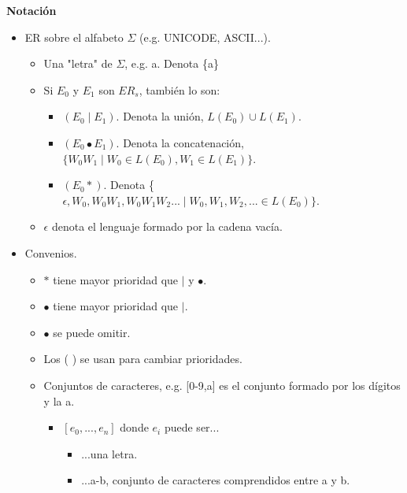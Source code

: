 \documentclass[\main/Apuntes_PL.tex]{subfiles}
\begin{document}
      \newpage
      \par \noindent
      \textbf{\large Notación}
      \begin{itemize}
        \item ER sobre el alfabeto $\Sigma$ (e.g. UNICODE, ASCII...).
              \begin{itemize}
                \item Una "letra" de $\Sigma$, e.g. a. Denota \{a\}
                \item Si $E_0$ y $E_1$ son $ER_s$, también lo son:
                      \begin{itemize}
                        \item $(E_0 \mid E_1)$. Denota la unión, $L(E_0) \cup L(E_1).$
                        \item $(E_0 \bullet E_1)$. Denota la concatenación, $ \{W_0 W_1 \mid W_0 \in  L(E_0), W_1 \in L(E_1)\}$.
                        \item $(E_0 \ast)$. Denota \{$\epsilon, W_0, W_0 W_1, W_0 W_1 W_2 ...\mid W_0, W_1, W_2, ... \in L(E_0)\}$.
                      \end{itemize}
                \item $\epsilon$ denota el lenguaje formado por la cadena vacía.
              \end{itemize}
        \item Convenios.
              \begin{itemize}
                \item $\ast$ tiene mayor prioridad que $\mid$ y $\bullet$.
                \item $\bullet$ tiene mayor prioridad que $\mid$.
                \item $\bullet$ se puede omitir.
                \item Los ( ) se usan para cambiar prioridades.
                \item Conjuntos de caracteres, e.g. [0-9,a] es el conjunto formado por los dígitos y la a.
                      \begin{itemize}
                        \item $[e_0, ..., e_n]$ donde $e_i$ puede ser...
                              \begin{itemize}
                                \item ...una letra.
                                \item ...a-b, conjunto de caracteres comprendidos entre a y b.
                              \end{itemize}

\end{itemize}
\end{itemize}
\end{itemize}
\end{document}
